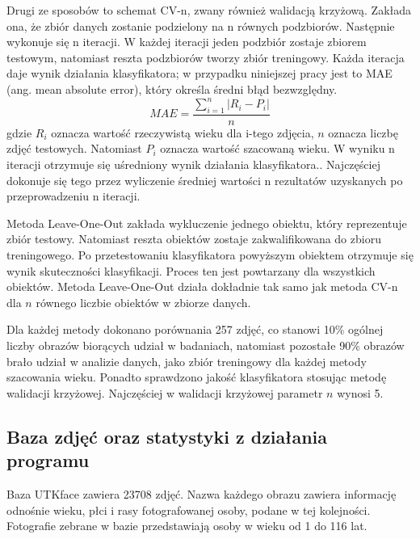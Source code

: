 \documentclass[a4paper,twoside,12pt]{book}
\begin{document}
    Drugi ze sposobów to schemat CV-n, zwany również walidacją krzyżową.
    Zakłada ona, że zbiór danych zostanie podzielony na n równych podzbiorów.
    Następnie wykonuje się n iteracji. W każdej iteracji jeden podzbiór zostaje zbiorem testowym, natomiast reszta
    podzbiorów tworzy zbiór treningowy.
    Każda iteracja daje wynik działania klasyfikatora; w przypadku niniejszej pracy jest to
    MAE (ang. mean absolute error), który określa średni błąd bezwzględny.
    \large
    \begin{equation}
        MAE = \frac{\sum_{i=1}^{n}\left | R_{i}-P_{i} \right |}{n}
        \label{wzor.mae}
    \end{equation}
    \normalsize
    gdzie $R_{i}$ oznacza wartość rzeczywistą wieku dla i-tego zdjęcia, $n$ oznacza liczbę zdjęć testowych.
    Natomiast $P_{i}$ oznacza wartość szacowaną wieku.
    W wyniku n iteracji otrzymuje się uśredniony wynik działania klasyfikatora.\cite{dataMiningAlgorithms}.
    Najczęściej dokonuje się tego przez wyliczenie średniej wartości n rezultatów uzyskanych po przeprowadzeniu
    n iteracji.

    Metoda Leave-One-Out zakłada wykluczenie jednego obiektu, który reprezentuje zbiór testowy. Natomiast reszta obiektów zostaje zakwalifikowana do zbioru treningowego.
    Po przetestowaniu klasyfikatora powyższym obiektem otrzymuje się wynik skuteczności klasyfikacji. Proces ten jest powtarzany dla wszystkich obiektów.
    Metoda Leave-One-Out działa dokładnie tak samo jak metoda CV-n dla $n$ równego liczbie obiektów
    w zbiorze danych.\cite{dataMiningAlgorithms}

    Dla każdej metody dokonano porównania 257 zdjęć, co stanowi 10\% ogólnej liczby obrazów biorących udział w
    badaniach, natomiast pozostałe 90\% obrazów brało udział w analizie danych, jako zbiór treningowy dla każdej metody
    szacowania wieku.
    Ponadto sprawdzono jakość klasyfikatora stosując metodę walidacji krzyżowej. Najczęściej w walidacji krzyżowej
    parametr $n$ wynosi 5.


    \subsection*{Baza zdjęć oraz statystyki z działania programu}
    Baza UTKface zawiera 23708 zdjęć.
    Nazwa każdego obrazu zawiera informację odnośnie wieku, płci i rasy fotografowanej osoby, podane w tej kolejności.
    Fotografie zebrane w bazie przedstawiają osoby w wieku od 1 do 116 lat.
\end{document}
